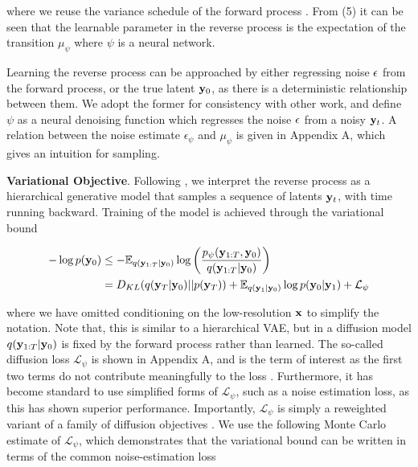 \documentclass{article}
\begin{document}
where we reuse the variance schedule of the forward process \citep{Ho2020}. From (5) it can be seen that the learnable parameter in the reverse process is the expectation of the transition $\mu_{\psi}$ where $\psi$ is a neural network. 

Learning the reverse process can be approached by either regressing noise $\bold{\epsilon}$ from the forward process, or the true latent $\bold{y}_{0}$, as there is a deterministic relationship between them. We adopt the former for consistency with other work, and define $\psi$ as a neural denoising function which regresses the noise $\bold{\epsilon}$ from a noisy $\bold{y}_{t}$. A relation between the noise estimate $\epsilon_{\psi}$ and $\mu_{\psi}$ is given in Appendix A, which gives an intuition for sampling.

\textbf{Variational Objective}. Following \citep{Kingma2021}, we interpret the reverse process as a hierarchical generative model that samples a sequence of latents $\bold{y}_{t}$, with time running backward. Training of the model is achieved through the variational bound

\begin{align}
-\log p(\bold{y}_{0}) &\leq -\mathbb{E}_{q(\bold{y}_{1:T}|\bold{y}_{0})} \log \left(\frac{p_{\psi}(\bold{y}_{1:T},\bold{y}_{0})}{q(\bold{y}_{1:T}|\bold{y}_{0})}\right) \\
&=  D_{KL}(q(\bold{y}_{T}|\bold{y}_{0}) || p(\bold{y}_{T})) + \mathbb{E}_{q(\bold{y}_{1}|\bold{y}_{0})} \log p(\bold{y}_{0}|\bold{y}_{1}) + \mathcal{L}_{\psi}
\end{align}

where we have omitted conditioning on the low-resolution $\bold{x}$ to simplify the notation. Note that, this is similar to a hierarchical VAE, but in a diffusion model $q(\bold{y}_{1:T}|\bold{y}_{0})$ is fixed by the forward process rather than learned. The so-called diffusion loss $\mathcal{L}_{\psi}$ is shown in Appendix A, and is the term of interest as the first two terms do not contribute meaningfully to the loss \citep{Ho2020}. Furthermore, it has become standard to use simplified forms of $\mathcal{L}_{\psi}$, such as a noise estimation loss, as this has shown superior performance. Importantly, $\mathcal{L}_{\psi}$ is simply a reweighted variant of a family of diffusion objectives \citep{Kingma2021,Kingma2023}. We use the following Monte Carlo estimate of $\mathcal{L}_{\psi}$, which demonstrates that the variational bound can be written in terms of the common noise-estimation loss
\end{document}
